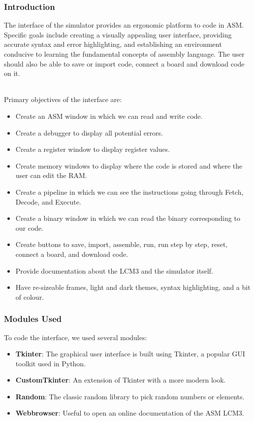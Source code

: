 \documentclass{article}
\begin{document}
\subsubsection{Introduction}

The interface of the simulator provides an ergonomic platform to code in ASM.\\
Specific goals include creating a visually appealing user interface, providing accurate syntax and error highlighting, and establishing an environment conducive to learning the fundamental concepts of assembly language. The user should also be able to save or import code, connect a board and download code on it.

\noindent \\Primary objectives of the interface are:

\begin{itemize}
  \item Create an ASM window in which we can read and write code.
  \item Create a debugger to display all potential errors.
  \item Create a register window to display register values.
  \item Create memory windows to display where the code is stored and where the user can edit the RAM.
  \item Create a pipeline in which we can see the instructions going through Fetch, Decode, and Execute.
  \item Create a binary window in which we can read the binary corresponding to our code.
  \item Create buttons to save, import, assemble, run, run step by step, reset, connect a board, and download code.
  \item Provide documentation about the LCM3 and the simulator itself.
  \item Have re-sizeable frames, light and dark themes, syntax highlighting, and a bit of colour.
\end{itemize}


\subsubsection{Modules Used}
To code the interface, we used several modules:

\begin{itemize}
    \item \textbf{Tkinter}: The graphical user interface is built using Tkinter, a popular GUI toolkit used in Python.
    \item \textbf{CustomTkinter}: An extension of Tkinter with a more modern look.
    \item \textbf{Random}: The classic random library to pick random numbers or elements.
    \item \textbf{Webbrowser}: Useful to open an online documentation of the ASM LCM3.
    
\end{itemize}
\end{document}
